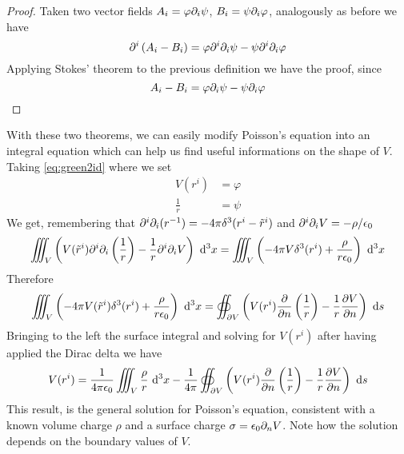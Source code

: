 \documentclass[../electromagnetism]{subfiles}
\begin{document}
\begin{proof}
	Taken two vector fields $A_i=\varphi\partial_i\psi$, $B_i=\psi\partial_i\varphi$, analogously as before we have
	\begin{equation*}
		\partial^i\left( A_i-B_i \right)=\varphi\partial^i\partial_i\psi-\psi\partial^i\partial_i\varphi
	\end{equation*}
	Applying Stokes' theorem to the previous definition we have the proof, since
	\begin{equation*}
		A_i-B_i=\varphi\partial_i\psi-\psi\partial_i\varphi
	\end{equation*}
\end{proof}
With these two theorems, we can easily modify Poisson's equation into an integral equation which can help us find useful informations on the shape of $V$.\\
Taking \eqref{eq:green2id} where we set
\begin{equation*}
	\begin{aligned}
		V(r^i)&=\varphi\\
		\frac{1}{r}&=\psi
	\end{aligned}
\end{equation*}
We get, remembering that $\partial^i\partial_i(r^{-1})=-4\pi\delta^3(r^i-\tilde{r}^i)$ and $\partial^i\partial_iV=-\rho/\epsilon_0$
\begin{equation*}
	\iiint_V\left(V(\tilde{r}^i)\partial^i\partial_i\left( \frac{1}{r} \right)-\frac{1}{r}\partial^i\partial_iV\right)\ \mathrm{d}^3x=\iiint_V\left( -4\pi V\delta^3(r^i)+\frac{\rho}{r\epsilon_0} \right)\ \mathrm{d}^3x
\end{equation*}
Therefore
\begin{equation*}
	\iiint_V\left( -4\pi V(\tilde{r}^i)\delta^3(r^i)+\frac{\rho}{r\epsilon_0} \right)\ \mathrm{d}^3x=\oiint_{\partial V}\left( V(r^i)\pdv{n}\left( \frac{1}{r} \right)-\frac{1}{r}\pdv{V}{n} \right)\ \mathrm{d} s
\end{equation*}
Bringing to the left the surface integral and solving for $V(r^i)$ after having applied the Dirac delta we have
\begin{equation}
	V(r^i)=\frac{1}{4\pi\epsilon_0}\iiint_V\frac{\rho}{r}\ \mathrm{d}^3x-\frac{1}{4\pi}\oiint_{\partial V}\left( V(r^i)\pdv{n}\left( \frac{1}{r} \right)-\frac{1}{r}\pdv{V}{n} \right)\ \mathrm{d} s
	\label{eq:gensol}
\end{equation}
This result, is the general solution for Poisson's equation, consistent with a known volume charge $\rho$ and a surface charge $\sigma=\epsilon_0\partial_nV$. Note how the solution depends on the boundary values of $V$.
\end{document}
